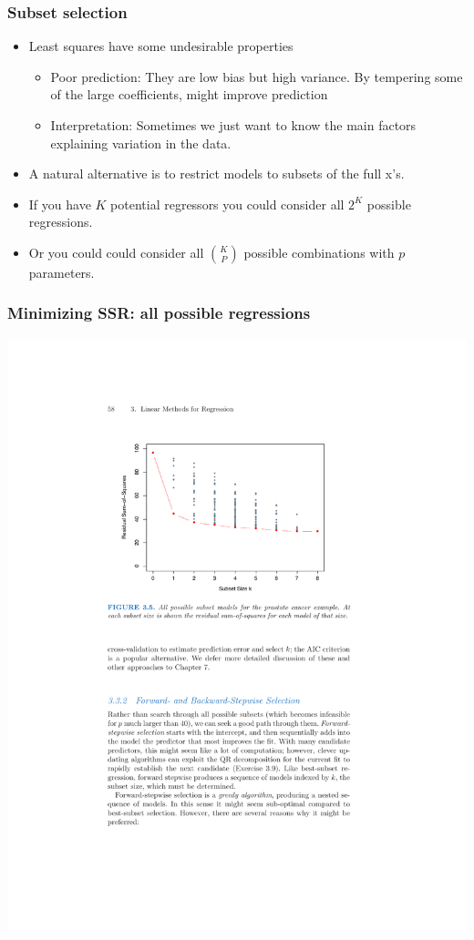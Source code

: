 \begin{frame}
    \frametitle{Subset selection}
    \begin{itemize}
    \item Least squares have some undesirable properties
    \begin{itemize}
        \item Poor prediction: They are low bias but high variance. By tempering some of the large coefficients, might improve prediction
        \item Interpretation: Sometimes we just want to know the main factors explaining variation in the data. 
    \end{itemize} 
    \item A natural alternative is to restrict models to subsets of the full x's. 
    \item If you have $K$ potential regressors you could consider all $2^K$ possible regressions.
    \item Or you could could consider all $K \choose P$ possible combinations with $p$ parameters.
    \end{itemize}
\end{frame}

\begin{frame}
\frametitle{Minimizing SSR: all possible regressions}
\vspace{-10pt}
\begin{center}
\includegraphics[width=\textwidth]{./resources/subsetsaic}
\end{center}
\end{frame}


